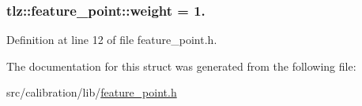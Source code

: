 \subsubsection[{\texorpdfstring{weight}{weight}}]{ tlz\+::feature\+\_\+point\+::weight = 1.}\hypertarget{structtlz_1_1feature__point_a3778df761d42f7fee3265ed996367ebc}{}\label{structtlz_1_1feature__point_a3778df761d42f7fee3265ed996367ebc}


Definition at line 12 of file feature\+\_\+point.\+h.



The documentation for this struct was generated from the following file\+:\begin{DoxyCompactItemize}
\item 
src/calibration/lib/\hyperlink{feature__point_8h}{feature\+\_\+point.\+h}\end{DoxyCompactItemize}
